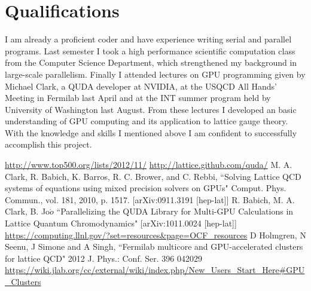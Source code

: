 \documentclass[11pt]{article}
\begin{document}
  \section*{Qualifications} %
  I am already a proficient coder and have experience writing serial and parallel programs.
  Last semester I took a high performance scientific computation class from the Computer Science Department, which strengthened my background in large-scale parallelism.
  Finally I attended lectures on GPU programming given by Michael Clark, a QUDA developer at NVIDIA, at the USQCD All Hands' Meeting in Fermilab last April and at the INT summer program held by University of Washington last August. 
  From these lectures I developed an basic understanding of GPU computing and its application to lattice gauge theory. 
  With the knowledge and skills I mentioned above I am confident to successfully accomplish this project.
  \pagebreak

%
\begin{thebibliography}{99}
\url{http://www.top500.org/lists/2012/11/}
\url{http://lattice.github.com/quda/}
M. A. Clark, R. Babich, K. Barros, R. C. Brower, and C. Rebbi,
``Solving Lattice QCD systems of equations using mixed precision solvers on GPUs" Comput. Phys. Commun., vol. 181, 2010, p. 1517. [arXiv:0911.3191 
[hep-lat]]
R. Babich, M. A. Clark, B. Jo$\acute{o}$ ``Parallelizing the QUDA Library for Multi-GPU Calculations in Lattice Quantum Chromodynamics" [arXiv:1011.0024 
[hep-lat]]
\url{https://computing.llnl.gov/?set=resources&page=OCF_resources}
D Holmgren, N Seenu, J Simone and A Singh, ``Fermilab multicore and GPU-accelerated clusters for lattice QCD" 2012 J. Phys.: Conf. Ser. 396 042029
\url{https://wiki.jlab.org/cc/external/wiki/index.php/New_Users_Start_Here#GPU_Clusters}

\end{thebibliography}
\end{document}
